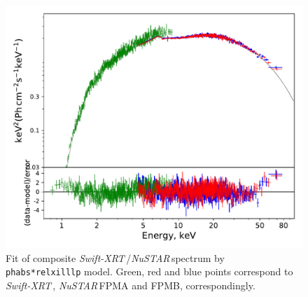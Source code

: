 \documentclass[a4paper,fleqn,usenatbib]{mnras}
\def\swiftx{{\em Swift-XRT\,}}
\def\nustar{{\em NuSTAR\,}}
\begin{document}
\begin{figure}
\centerline{\includegraphics[width=\linewidth]{spectrumfit_v04.pdf}}
\caption{Fit of composite \swiftx/\nustar spectrum by \texttt{phabs*relxilllp} model. Green, red and blue points correspond to \swiftx, \nustar FPMA and FPMB, correspondingly.} 
\label{fig:spec}
\end{figure}  
\end{document}
